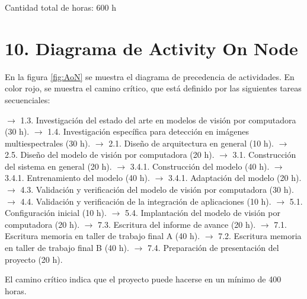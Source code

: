 \documentclass[
11pt, %
]{charter}
\begin{document}
Cantidad total de horas: 600 h

\section{10. Diagrama de Activity On Node}
\label{sec:AoN}

En la figura \ref{fig:AoN} se muestra el diagrama de precedencia de actividades. En color rojo, se muestra el camino crítico, que está definido por las siguientes tareas secuenciales:

$\rightarrow$ 1.3. Investigación del estado del arte en modelos de visión por computadora (30 h). \newline
$\rightarrow$ 1.4. Investigación específica para detección en imágenes multiespectrales (30 h). \newline
$\rightarrow$ 2.1. Diseño de arquitectura en general (10 h). \newline
$\rightarrow$ 2.5. Diseño del modelo de visión por computadora (20 h). \newline
$\rightarrow$ 3.1. Construcción del sistema en general (20 h). \newline
$\rightarrow$ 3.4.1. Construcción del modelo (40 h). \newline
$\rightarrow$ 3.4.1. Entrenamiento del modelo (40 h). \newline
$\rightarrow$ 3.4.1. Adaptación del modelo (20 h). \newline
$\rightarrow$ 4.3. Validación y verificación del modelo de visión por computadora (30 h). \newline
$\rightarrow$ 4.4. Validación y verificación de la integración de aplicaciones (10 h). \newline
$\rightarrow$ 5.1. Configuración inicial (10 h). \newline
$\rightarrow$ 5.4. Implantación del modelo de visión por computadora (20 h). \newline
$\rightarrow$ 7.3. Escritura del informe de avance (20 h). \newline
$\rightarrow$ 7.1. Escritura memoria en taller de trabajo final A (40 h). \newline
$\rightarrow$ 7.2. Escritura memoria en taller de trabajo final B (40 h). \newline
$\rightarrow$ 7.4. Preparación de presentación del proyecto (20 h). \newline


El camino crítico indica que el proyecto puede hacerse en un mínimo de 400 horas.
\end{document}
